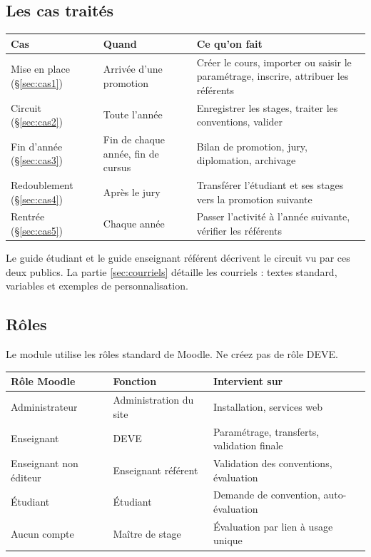 \documentclass[11pt,a4paper]{article}
\begin{document}
\subsection{Les cas traités}

\begin{center}
\begin{tabularx}{\linewidth}{@{}l l X@{}}
\toprule
\textbf{Cas} & \textbf{Quand} & \textbf{Ce qu'on fait} \\
\midrule
Mise en place (§\ref{sec:cas1}) & Arrivée d'une promotion & Créer le cours, importer ou saisir le paramétrage, inscrire, attribuer les référents \\
Circuit (§\ref{sec:cas2}) & Toute l'année & Enregistrer les stages, traiter les conventions, valider \\
Fin d'année (§\ref{sec:cas3}) & Fin de chaque année, fin de cursus & Bilan de promotion, jury, diplomation, archivage \\
Redoublement (§\ref{sec:cas4}) & Après le jury & Transférer l'étudiant et ses stages vers la promotion suivante \\
Rentrée (§\ref{sec:cas5}) & Chaque année & Passer l'activité à l'année suivante, vérifier les référents \\
\bottomrule
\end{tabularx}
\end{center}

Le guide étudiant et le guide enseignant référent décrivent le circuit vu par
ces deux publics. La partie \ref{sec:courriels} détaille les courriels : textes standard,
variables et exemples de personnalisation.

\subsection{Rôles}

Le module utilise les rôles standard de Moodle. Ne créez pas de rôle
\og DEVE\fg{}.

\begin{center}
\begin{tabularx}{\linewidth}{@{}l l X@{}}
\toprule
\textbf{Rôle Moodle} & \textbf{Fonction} & \textbf{Intervient sur} \\
\midrule
Administrateur & Administration du site & Installation, services web \\
Enseignant & DEVE & Paramétrage, transferts, validation finale \\
Enseignant non éditeur & Enseignant référent & Validation des conventions, évaluation \\
Étudiant & Étudiant & Demande de convention, auto-évaluation \\
Aucun compte & Maître de stage & Évaluation par lien à usage unique \\
\bottomrule
\end{tabularx}
\end{center}
\end{document}
